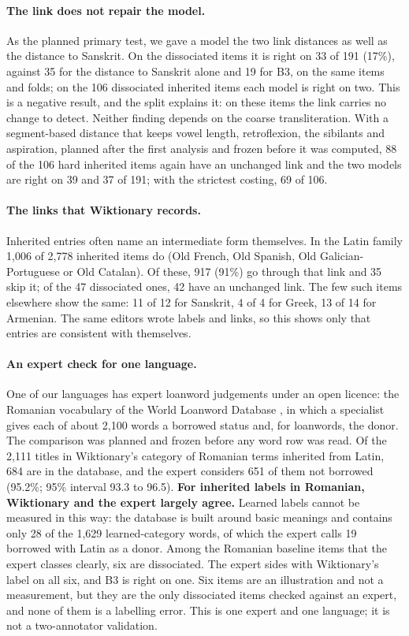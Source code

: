 \documentclass[11pt]{article}
\begin{document}
\paragraph{The link does not repair the model.} As the planned primary test, we gave a model the two link distances as well as the distance to Sanskrit. On the dissociated items it is right on 33 of 191 (17\%), against 35 for the distance to Sanskrit alone and 19 for B3, on the same items and folds; on the 106 dissociated inherited items each model is right on two. This is a negative result, and the split explains it: on these items the link carries no change to detect. Neither finding depends on the coarse transliteration. With a segment-based distance that keeps vowel length, retroflexion, the sibilants and aspiration, planned after the first analysis and frozen before it was computed, 88 of the 106 hard inherited items again have an unchanged link and the two models are right on 39 and 37 of 191; with the strictest costing, 69 of 106.

\paragraph{The links that Wiktionary records.} Inherited entries often name an intermediate form themselves. In the Latin family 1,006 of 2,778 inherited items do (Old French, Old Spanish, Old Galician-Portuguese or Old Catalan). Of these, 917 (91\%) go through that link and 35 skip it; of the 47 dissociated ones, 42 have an unchanged link. The few such items elsewhere show the same: 11 of 12 for Sanskrit, 4 of 4 for Greek, 13 of 14 for Armenian. The same editors wrote labels and links, so this shows only that entries are consistent with themselves.

\paragraph{An expert check for one language.} One of our languages has expert loanword judgements under an open licence: the Romanian vocabulary of the World Loanword Database \citep{schulte2009romanian}, in which a specialist gives each of about 2,100 words a borrowed status and, for loanwords, the donor. The comparison was planned and frozen before any word row was read. Of the 2,111 titles in Wiktionary's category of Romanian terms inherited from Latin, 684 are in the database, and the expert considers 651 of them not borrowed (95.2\%; 95\% interval 93.3 to 96.5). \textbf{For inherited labels in Romanian, Wiktionary and the expert largely agree.} Learned labels cannot be measured in this way: the database is built around basic meanings and contains only 28 of the 1,629 learned-category words, of which the expert calls 19 borrowed with Latin as a donor. Among the Romanian baseline items that the expert classes clearly, six are dissociated. The expert sides with Wiktionary's label on all six, and B3 is right on one. Six items are an illustration and not a measurement, but they are the only dissociated items checked against an expert, and none of them is a labelling error. This is one expert and one language; it is not a two-annotator validation.
\end{document}
